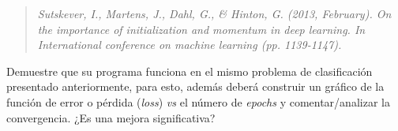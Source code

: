 \documentclass[11pt]{article}
\begin{document}
\begin{quote}
\emph{Sutskever, I., Martens, J., Dahl, G., \& Hinton, G. (2013,
February). On the importance of initialization and momentum in deep
learning. In International conference on machine learning (pp.
1139-1147).}
\end{quote}

Demuestre que su programa funciona en el mismo problema de clasificación
presentado anteriormente, para esto, además deberá construir un gráfico
de la función de error o pérdida (\emph{loss}) \emph{vs} el número de
\emph{epochs} y comentar/analizar la convergencia. ¿Es una mejora
significativa?


    
    
    
    
\end{document}
